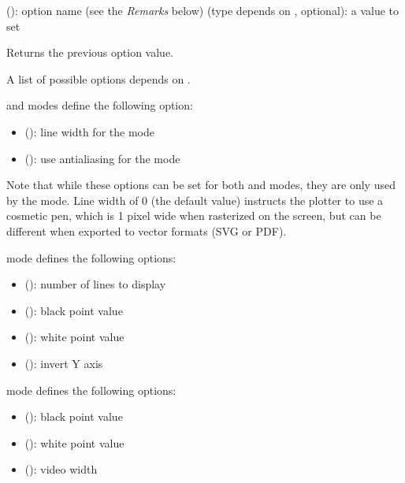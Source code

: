 \documentclass[a4paper,12pt,twoside,extrafontsizes]{memoir}
\begin{document}
\begin{funcparams}
	 (): option name (see the \emph{Remarks} below)
	 (type depends on , optional): a value to set
\end{funcparams}

\begin{funcret}
	Returns the previous option value.
\end{funcret}

\begin{funcremarks}
	A list of possible options depends on .
	
	 and  modes define the following option:
	
	\begin{itemize}
		\item {} (): line width for the  mode
		\item {} (): use antialiasing for the  mode
	\end{itemize}
	
	Note that while these options can be set for both  and  modes, they are only used by the  mode. Line width of 0 (the default value) instructs the plotter to use a cosmetic pen, which is 1 pixel wide when rasterized on the screen, but can be different when exported to vector formats (SVG or PDF).
	
	 mode defines the following options:
	
	\begin{itemize}
		\item {} (): number of lines to display
		\item {} (): black point value
		\item {} (): white point value
		\item {} (): invert Y axis
	\end{itemize}

	 mode defines the following options:
	
	\begin{itemize}
		\item {} (): black point value
		\item {} (): white point value
		\item {} (): video width
	\end{itemize}


\end{funcremarks}
\end{document}
